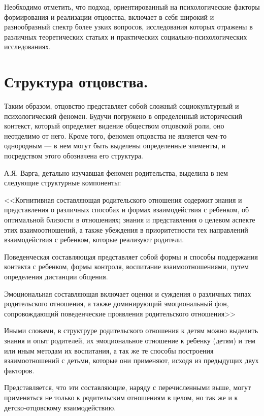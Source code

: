 \documentclass{../../common/thesisbyxetex}
\begin{document}
Необходимо отметить, что подход, ориентированный на психологические факторы формирования и
реализации отцовства, включает в себя широкий и разнообразный спектр более узких вопросов,
исследования которых отражены в различных теоретических статьях и практических
социально-психологических исследованиях.



\section{Структура отцовства.}

Таким образом, отцовство представляет собой сложный  социокультурный и психологический феномен.
Будучи погружено в определенный исторический контекст, который определяет видение обществом
отцовской роли, оно неотделимо от него. Кроме того, феномен отцовства не является чем-то однородным
--- в нем могут быть выделены определенные элементы, и посредством этого обозначена его структура.

А.Я. Варга, детально изучавшая феномен родительства, выделила в нем следующие структурные
компоненты:

<<Когнитивная составляющая родительского отношения содержит знания и
представления о различных способах и формах взаимодействия с ребенком, об
оптимальной близости в отношениях; знания и представления о целевом аспекте этих
взаимоотношений, а также убеждения в приоритетности тех направлений
взаимодействия с ребенком, которые реализуют родители.

Поведенческая составляющая представляет собой формы и способы поддержания
контакта с ребенком, формы контроля, воспитание взаимоотношениями, путем
определения дистанции общения.

Эмоциональная составляющая включает оценки и суждения о различных типах
родительского отношения, а также доминирующий эмоциональный фон,
сопровождающий поведенческие проявления родительского отношения>> \cite{varga}

Иными словами, в структруре родительского отношения к детям можно выделить знания и опыт родителей,
их эмоциональное отношение к ребенку (детям) и тем или иным методам их воспитания, а так же те
способы построения взаимоотношений с детьми,
которые они применяют, исходя из предыдущих двух факторов.

Представляется, что эти составляющие,
наряду с перечисленными выше, могут применяться не только к родительским отношениям в целом, но
так же и к детско-отцовскому взаимодействию.
\end{document}
